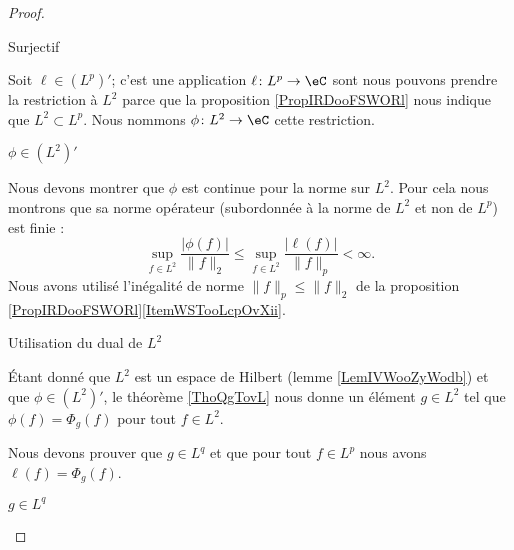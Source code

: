 \begin{proof}
\begin{subproof}
        \item[Surjectif]

            Soit \( \ell\in (L^p)'\); c'est une application \( \ell\colon L^p\to \eC\) sont nous pouvons prendre la restriction à \( L^2\) parce que la proposition \ref{PropIRDooFSWORl} nous indique que \( L^2\subset L^p\). Nous nommons \( \phi\colon L^2\to \eC\) cette restriction.

            \begin{subproof}

                \item[\( \phi\in (L^2)'\)]

                    Nous devons montrer que \( \phi\) est continue pour la norme sur \( L^2\). Pour cela nous montrons que sa norme opérateur (subordonnée à la norme de \( L^2\) et non de \( L^p\)) est finie :
                    \begin{equation}
                        \sup_{f\in L^2}\frac{ | \phi(f) | }{ \| f \|_{2} }\leq \sup_{f\in L^2}\frac{ | \ell(f) | }{ \| f \|_p }<\infty.
                    \end{equation}
                    Nous avons utilisé l'inégalité de norme \( \| f \|_p\leq \| f \|_2\) de la proposition \ref{PropIRDooFSWORl}\ref{ItemWSTooLcpOvXii}.

                \item[Utilisation du dual de \( L^2\)]

                    Étant donné que \( L^2\) est un espace de Hilbert (lemme \ref{LemIVWooZyWodb}) et que \( \phi\in (L^2)'\), le théorème \ref{ThoQgTovL} nous donne un élément \( g\in L^2\) tel que \( \phi(f)=\Phi_g(f)\) pour tout \( f\in L^2\).

                    Nous devons prouver que \( g\in L^q\) et que pour tout \( f\in L^p\) nous avons \( \ell(f)=\Phi_g(f)\).

                \item[\( g\in L^q\)]


\end{subproof}
\end{subproof}
\end{proof}
